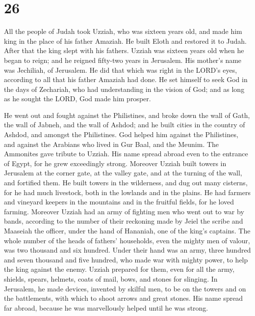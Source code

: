 \hypertarget{section-25}{%
\section{26}\label{section-25}}

 All the people of Judah took Uzziah, who was sixteen
years old, and made him king in the place of his father Amaziah.
 He built Eloth and restored it to Judah. After that the
king slept with his fathers.  Uzziah was sixteen years old
when he began to reign; and he reigned fifty-two years in Jerusalem. His
mother's name was Jechiliah, of Jerusalem.  He did that
which was right in the LORD's eyes, according to all that his father
Amaziah had done.  He set himself to seek God in the days
of Zechariah, who had understanding in the vision of God; and as long as
he sought the LORD, God made him prosper.

 He went out and fought against the Philistines, and broke
down the wall of Gath, the wall of Jabneh, and the wall of Ashdod; and
he built cities in the country of Ashdod, and amongst the Philistines.
 God helped him against the Philistines, and against the
Arabians who lived in Gur Baal, and the Meunim.  The
Ammonites gave tribute to Uzziah. His name spread abroad even to the
entrance of Egypt, for he grew exceedingly strong. 
Moreover Uzziah built towers in Jerusalem at the corner gate, at the
valley gate, and at the turning of the wall, and fortified them.
 He built towers in the wilderness, and dug out many
cisterns, for he had much livestock, both in the lowlands and in the
plains. He had farmers and vineyard keepers in the mountains and in the
fruitful fields, for he loved farming.  Moreover Uzziah
had an army of fighting men who went out to war by bands, according to
the number of their reckoning made by Jeiel the scribe and Maaseiah the
officer, under the hand of Hananiah, one of the king's captains.
 The whole number of the heads of fathers' households,
even the mighty men of valour, was two thousand and six hundred.
 Under their hand was an army, three hundred and seven
thousand and five hundred, who made war with mighty power, to help the
king against the enemy.  Uzziah prepared for them, even
for all the army, shields, spears, helmets, coats of mail, bows, and
stones for slinging.  In Jerusalem, he made devices,
invented by skilful men, to be on the towers and on the battlements,
with which to shoot arrows and great stones. His name spread far abroad,
because he was marvellously helped until he was strong.

